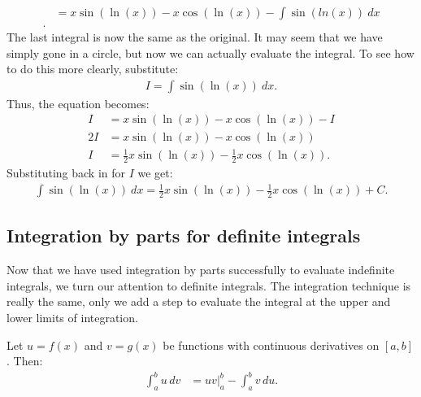 \documentclass{report}
\begin{document}
{\begin{align*}
                &= x\sin{(\ln{(x)})} - x\cos{(\ln{(x)})}- \int \sin{(ln(x))}\ dx \\
            .\end{align*}
            \bigbreak \noindent 
            The last integral is now the same as the original. It may seem that we have simply gone in a circle, but now we can actually evaluate the integral. To see how to do this more clearly, substitute:
            \begin{align*}
                I = \int \sin{(\ln{(x)})}\ dx
            .\end{align*}
            \bigbreak \noindent 
            Thus, the equation becomes:
            \begin{align*}
                I &= x\sin{(\ln{(x)})} - x\cos{(\ln{(x)})} - I \\
                  2I&=x\sin{(\ln{(x)})} - x\cos{(\ln{(x)})}  \\
                    I&= \frac{1}{2}x\sin{(\ln{(x)})} - \frac{1}{2}x\cos{(\ln{(x)})}
            .\end{align*}
            \bigbreak \noindent 
            Substituting back in for $I$ we get:
            \begin{align*}
                \int \sin{(\ln{(x)})}\ dx  = \frac{1}{2}x\sin{(\ln{(x)})} - \frac{1}{2}x\cos{(\ln{(x)})} + C
            .\end{align*}
            \bigbreak \noindent 
        }

        \bigbreak \noindent 
        \subsection*{Integration by parts for definite integrals}
        \bigbreak \noindent 
        Now that we have used integration by parts successfully to evaluate indefinite integrals, we turn our attention to definite integrals. The integration technique is really the same, only we add a step to evaluate the integral at the upper and lower limits of integration.
        \bigbreak \noindent 
        \begin{thrm}
           Let  $u = f(x)$  and  $v = g(x)$ be functions with continuous derivatives on $[a,b]$. Then:
           \begin{align*}
               \int_{a}^{b} u \, dv &= uv\big|_{a}^{b} - \int_{a}^{b} v \, du
           .\end{align*}
        \end{thrm}
\end{document}
